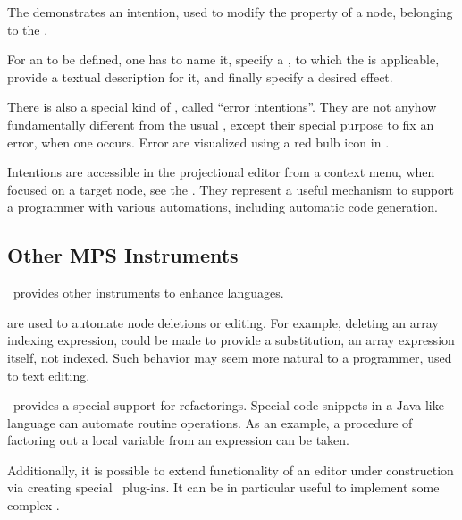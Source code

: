 The  demonstrates an intention, used to modify the  property of a node, belonging to 
the  . 

For an  to be defined, one has to name it, specify a , to which the  is applicable,
provide a textual description for it, and finally specify a desired effect. 

There is also a special kind of , called ``error intentions''. They are not anyhow fundamentally different 
from the usual , except their special purpose to fix an error, when one occurs. 
Error  are visualized using a red bulb icon in \jbmps.

Intentions are accessible in the projectional editor from a context menu, when focused on a target node, see the . They represent 
a useful mechanism to support a programmer with various automations, including automatic code generation.


\subsection{Other MPS Instruments}
\label{othermpsinstruments}

\jbmps\ provides other instruments to enhance languages. 

 are used to automate node deletions or editing. For example, deleting an array indexing expression, could be made
to provide a substitution, an array expression itself, not indexed. Such behavior may seem more natural to a programmer, used to text editing.

\jbmps\ provides a special support for refactorings. Special code snippets in a Java-like language can automate routine operations.
As an example, a procedure of factoring out a local variable from an expression can be taken.

Additionally, it is possible to extend functionality of an editor under construction via creating special \jbmps\ plug-ins. 
It can be in particular useful to implement some complex .
